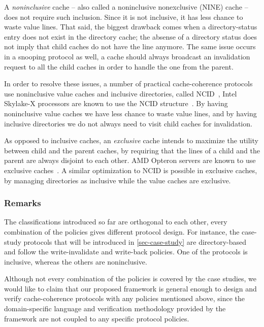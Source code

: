 A \emph{noninclusive} cache -- also called a noninclusive nonexclusive (NINE) cache -- does not require such inclusion.
Since it is not inclusive, it has less chance to waste value lines.
That said, the biggest drawback comes when a directory-status entry does not exist in the directory cache; the absense of a directory status does not imply that child caches do not have the line anymore.
The same issue occurs in a snooping protocol as well, \eg{} a cache should always broadcast an invalidation request to all the child caches in order to handle the one from the parent.

In order to resolve these issues, a number of practical cache-coherence protocols use noninclusive value caches and inclusive directories, called NCID~\cite{Zhao:2010}, \eg{} Intel Skylake-X processors are known to use the NCID structure~\cite{intel-non-inclusive,Yan:2019}.
By having noninclusive value caches we have less chance to waste value lines, and by having inclusive directories we do not always need to visit child caches for invalidation.

As opposed to inclusive caches, an \emph{exclusive} cache intends to maximize the utility between child and the parent caches, by requiring that the lines of a child and the parent are always disjoint to each other.
AMD Opteron servers are known to use exclusive caches~\cite{Irazoqui:2016}.
A similar optimization to NCID is possible in exclusive caches, by managing directories as inclusive while the value caches are exclusive.

\subsubsection{Remarks}

The classifications introduced so far are orthogonal to each other, \ie{} every combination of the policies gives different protocol design.
For instance, the case-study protocols that will be introduced in \autoref{sec-case-study} are directory-based and follow the write-invalidate and write-back policies.
One of the protocols is inclusive, whereas the others are noninclusive.

Although not every combination of the policies is covered by the case studies, we would like to claim that our proposed framework \hemiola{} is general enough to design and verify cache-coherence protocols with any policies mentioned above, since the domain-specific language and verification methodology provided by the framework are not coupled to any specific protocol policies.

